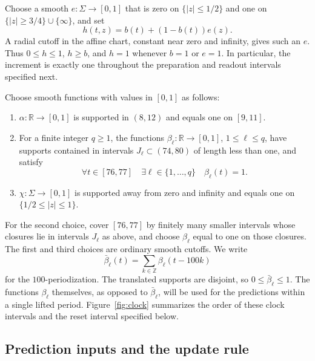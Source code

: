 Choose a smooth $e\colon\Sigma\to[0,1]$ that is zero on
$\{|z|\le1/2\}$ and one on $\{|z|\ge3/4\}\cup\{\infty\}$, and set
\begin{equation}
\label{eq:clock-increment}
 h(t,z)=b(t)+(1-b(t))e(z).
\end{equation}
A radial cutoff in the affine chart, constant near zero and infinity,
gives such an $e$.  Thus $0\le h\le1$, $h\ge b$, and $h=1$ whenever
$b=1$ or $e=1$.  In particular, the increment is exactly one throughout
the preparation and readout intervals specified next.

Choose smooth functions with values in $[0,1]$ as follows:
\begin{enumerate}
\item $\alpha\colon\mathbb R\to[0,1]$ is supported in $(8,12)$
      and equals one on $[9,11]$.
\item For a finite integer $q\ge1$, the functions
      $\beta_\ell\colon\mathbb R\to[0,1]$, $1\le \ell\le q$, have supports
      contained in intervals $J_\ell\subset(74,80)$ of length less than one,
      and satisfy
      \begin{equation}
      \label{eq:readout-cover}
       \forall t\in[76,77]\quad
       \exists \ell\in\{1,\ldots,q\}\quad \beta_\ell(t)=1.
      \end{equation}
\item $\chi\colon\Sigma\to[0,1]$ is supported away from zero and infinity
      and equals one on $\{1/2\le |z|\le1\}$.
\end{enumerate}
For the second choice, cover $[76,77]$ by finitely many smaller intervals
whose closures lie in intervals $J_\ell$ as above, and choose $\beta_\ell$ equal
to one on those closures.  The first and third choices are ordinary
smooth cutoffs.  We write
\[
 \bar\beta_\ell(t)=\sum_{k\in\mathbb Z}\beta_\ell(t-100k)
\]
for the $100$-periodization.  The translated supports are disjoint, so
$0\le\bar\beta_\ell\le1$.  The functions
$\beta_\ell$ themselves, as opposed to $\bar\beta_\ell$, will be used for the
predictions within a single lifted period.
Figure~\ref{fig:clock} summarizes the order of these clock intervals
and the reset interval specified below.

\subsection{Prediction inputs and the update rule}

